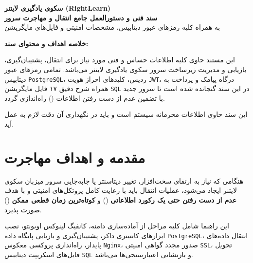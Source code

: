 \documentclass[11pt,a4paper]{article}
\begin{document}
\begin{titlepage}
    \centering
    \vspace*{1.5cm}
    
    {\Huge\textbf{سکوی یادگیری لایتنر (RightLearn)}}\\[0.8cm]
    {\LARGE\textbf{سند فنی و دستورالعمل جامع انتقال و مهاجرت سرور}}\\[0.4cm]
    {\Large به همراه کلیه رمزهای عبور دیتابیس، مشخصات امنیتی و فایل‌های مایگریشن }\\[1.5cm]
    
    \vspace*{2cm}
    
    \begin{trivlist}
        \item \textbf{خلاصه اهداف و محتوای سند:}
        \item این مستند حاوی کلیه اطلاعات حساس و فنی مورد نیاز برای انتقال، پشتیبان‌گیری، بازیابی و مدیریت زیرساخت سرور سکوی یادگیری لایتنر می‌باشد. تمامی رمزهای عبور دیتابیس \verb|PostgreSQL|، ردیس، کلیدهای احراز هویت \verb|JWT|، درگاه پیامک و پرداخت به همراه شرح دقیق ۱۷ فایل مایگریشن \verb|SQL| در این سند گنجانده شده است تا سرور جدید با تضمین عدم از دست رفتن اطلاعات () راه‌اندازی گردد.
    \end{trivlist}
    
    \vfill
    {\small این سند حاوی اطلاعات محرمانه سیستم است و باید در نگهداری آن دقت لازم به عمل آید.}
\end{titlepage}

\tableofcontents
\newpage

\section{مقدمه و اهداف مهاجرت}
هنگامی که نیاز به ارتقای سخت‌افزار، تغییر دیتاسنتر یا جابه‌جایی سرور میزبان سکوی لایتنر ایجاد می‌شود، عملیات انتقال باید با رعایت کامل پروتکل‌های امنیتی و با هدف \textbf{عدم از دست رفتن حتی یک رکورد اطلاعاتی} () و \textbf{کوتاه‌ترین زمان قطعی ممکن} () صورت پذیرد.

این راهنما شامل کلیه مراحل از آماده‌سازی دامنه، کانفیگ لینوکس اوبونتو، نصب ابزارهای کانتینری داکر، پشتیبان‌گیری و بازیابی پایگاه داده \verb|PostgreSQL|، انتقال داده‌های پایدار، راه‌اندازی پروکسی معکوس \verb|Nginx|، صدور مجدد گواهی امنیتی \verb|SSL|، تحویل فایل‌های اسکریپت دیتابیس \verb|SQL| و بازنشانی اعتبارسنجی‌ها می‌باشد.
\end{document}
